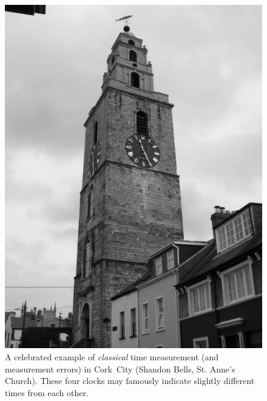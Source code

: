 \begin{savenotes}
\begin{figure}[p]
  \centering
  \includegraphics[height=.5\textheight]{img/Shandon_bells_cork.McCarron.grey.jpg}
  \caption[
    Classical Time. The \emph{Four Faced Liar}, Shandon Bells, Cork
  ]{
    A celebrated example of \emph{classical} time measurement (and measurement errors) in Cork~City
    (Shandon Bells, St. Anne's Church).
    These four clocks
    may famously
    indicate slightly different times from each other.
    \parencite{McCarron, CorkStrolls}
  }
  \label{fig:ShandonBells}
\end{figure}
\end{savenotes}